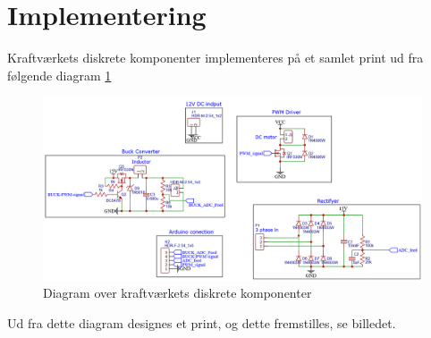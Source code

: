 \documentclass[../main.tex]{subfiles}
\begin{document}
\section{Implementering}
Kraftværkets diskrete komponenter implementeres på et samlet print ud fra følgende diagram \ref{fig: Kraftverk_diagram_samlet}
\begin{figure}[H]
      \includegraphics[width=\textwidth]{Dokumentation/Figures/Kraftverk_diagram_samlet.png}
     \caption{Diagram over kraftværkets diskrete komponenter}
     \label{fig: Kraftverk_diagram_samlet}
     \end{figure}
Ud fra dette diagram designes et print, og dette fremstilles, se billedet.
\end{document}
